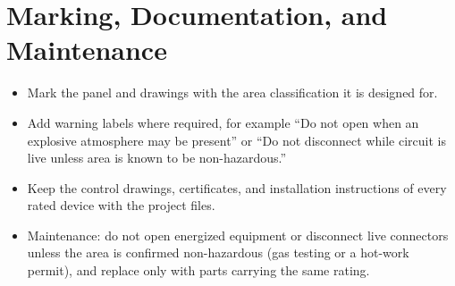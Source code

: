 \section{Marking, Documentation, and Maintenance}
\begin{itemize}[itemsep=1pt]
  \item Mark the panel and drawings with the area classification it is designed for.
  \item Add warning labels where required, for example ``Do not open when an explosive atmosphere may be present'' or ``Do not disconnect while circuit is live unless area is known to be non-hazardous.''
  \item Keep the control drawings, certificates, and installation instructions of every rated device with the project files.
  \item Maintenance: do not open energized equipment or disconnect live connectors unless the area is confirmed non-hazardous (gas testing or a hot-work permit), and replace only with parts carrying the same rating.
\end{itemize}

